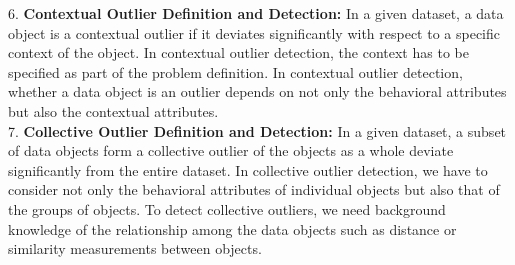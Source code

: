 \documentclass[10pt]{article}
\begin{document}
\begin{flushleft}
\vspace{0.5em}
6. \textbf{Contextual Outlier Definition and Detection:} In a given dataset, a data object is a contextual outlier if it deviates significantly with respect to a specific context of the object. In contextual outlier detection, the context has to be specified as part of the problem definition. In contextual outlier detection, whether a data object is an outlier depends on not only the behavioral attributes but also the contextual attributes.\\
\vspace{0.5em}
7. \textbf{Collective Outlier Definition and Detection:} In a given dataset, a subset of data objects form a collective outlier of the objects as a whole deviate significantly from the entire dataset. In collective outlier detection, we have to consider not only the behavioral attributes of individual objects but also that of the groups of objects. To detect collective outliers, we need background knowledge of the relationship among the data objects such as distance or similarity measurements between objects.\\
\vspace{0.5em}
\end{flushleft}
\end{document}
